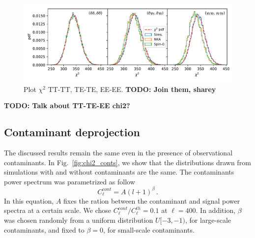 \documentclass[a4paper,11pt]{article}
\newcommand{\todo}[1]{{\bf TODO: #1}}
\newcommand{\clth}{C_\ell^{th}}
\newcommand{\clc}{C_\ell^{cont}}
\begin{document}
\begin{figure}[htb]
  \centering
  \includegraphics[width=\textwidth]{./figures/run_sph_2b_1stbin_chi2_TT_TE_EE.pdf}
  \caption{Plot $\chi^2$ TT-TT, TE-TE, EE-EE. \todo{Join them, sharey}}
  \label{fig:chi2_1bin}
\end{figure}

\todo{Talk about TT-TE-EE chi2?}

\subsection{Contaminant deprojection}

The discussed results remain the same even in the presence of observational
contaminants. In Fig.~\ref{fig:chi2_conts}, we show that the distributions drawn
from simulations with and without contaminants are the same. The contaminants
power spectrum was parametrized as follow
\begin{equation}
  \clc = A (l + 1)^{\beta}\,.
  \label{eq:conts}
\end{equation}
In this equation, $A$ fixes the ration between the contaminant and signal
power spectra at a certain scale. We chose $\clc/\clth = 0.1$ at $\ell=400$.
In addition, $\beta$ was chosen randomly from a uniform distribution $U[-3,
-1)$, for large-scale contaminants, and fixed to $\beta=0$, for small-scale
contaminants. 
\end{document}

